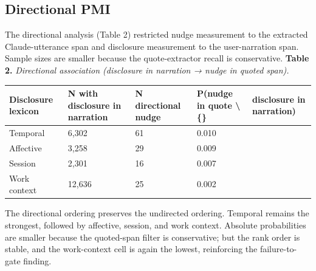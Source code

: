 \documentclass{obelus-preprint}
\begin{document}
\subsection{Directional PMI}
The directional analysis (Table 2) restricted nudge measurement to the extracted Claude-utterance span and disclosure measurement to the user-narration span. Sample sizes are smaller because the quote-extractor recall is conservative.
\textbf{Table 2.} \emph{Directional association (disclosure in narration → nudge in quoted span).}
\begin{center}
\begin{tabular}{lllll}
\toprule
\textbf{Disclosure lexicon} & \textbf{N with disclosure in narration} & \textbf{N directional nudge} & \textbf{P(nudge in quote \textbackslash\{\}} & \textbf{disclosure in narration)} \\
\midrule
Temporal & 6,302 & 61 & 0.010 &  \\
Affective & 3,258 & 29 & 0.009 &  \\
Session & 2,301 & 16 & 0.007 &  \\
Work context & 12,636 & 25 & 0.002 &  \\
\bottomrule
\end{tabular}
\end{center}
The directional ordering preserves the undirected ordering. Temporal remains the strongest, followed by affective, session, and work context. Absolute probabilities are smaller because the quoted-span filter is conservative; but the rank order is stable, and the work-context cell is again the lowest, reinforcing the failure-to-gate finding.
\end{document}

